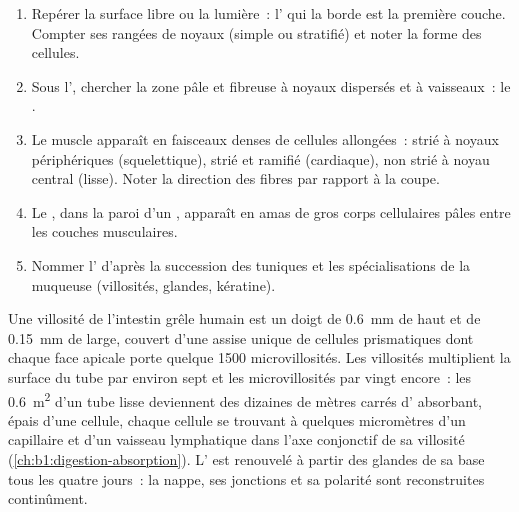 \begin{method}\label{met:b1:body-plans-tissues:histology}
\begin{enumerate}
  \item Repérer la surface libre ou la lumière~: l' qui la
        borde est la première couche. Compter ses rangées de noyaux
        (simple ou stratifié) et noter la forme des cellules.
  \item Sous l', chercher la zone pâle et fibreuse à noyaux
        dispersés et à vaisseaux~: le .
  \item Le muscle apparaît en faisceaux denses de cellules allongées~:
        strié à noyaux périphériques (squelettique), strié et ramifié
        (cardiaque), non strié à noyau central (lisse). Noter la
        direction des fibres par rapport à la coupe.
  \item Le , dans la paroi d'un , apparaît en amas de
        gros corps cellulaires pâles entre les couches musculaires.
  \item Nommer l' d'après la succession des tuniques et les
        spécialisations de la muqueuse (villosités, glandes, kératine).
\end{enumerate}
\end{method}

\begin{example}\label{ex:b1:body-plans-tissues:villus}
Une villosité de l'intestin grêle humain est un doigt de \qty{0.6}{mm}
de haut et de \qty{0.15}{mm} de large, couvert d'une assise unique de
cellules prismatiques dont chaque face apicale porte quelque
\qty{1500}{} microvillosités. Les villosités multiplient la surface du
tube par environ sept et les microvillosités par vingt encore~: les
\qty{0.6}{m^2} d'un tube lisse deviennent des dizaines de mètres carrés
d' absorbant, épais d'une cellule, chaque cellule se trouvant
à quelques micromètres d'un capillaire et d'un vaisseau lymphatique dans
l'axe conjonctif de sa villosité
(\cref{ch:b1:digestion-absorption}). L' est renouvelé à partir
des glandes de sa base tous les quatre jours~: la nappe, ses jonctions
et sa polarité sont reconstruites continûment.
\end{example}

